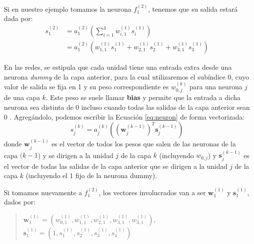 \documentclass[../../main.tex]{subfiles}
\begin{document}

Si en nuestro ejemplo tomamos la neurona \(f^{(2)}_1\), tenemos que su salida estará dada
por:
\begin{align*}
    s^{(2)}_1 &= a^{(2)}_1 \left( \sum_{i=1}^{3} w^{(1)}_{i,1} s^{(1)}_i \right) \\
              &= a^{(2)}_1 \left( w^{(1)}_{1,1}s^{(1)}_1 +  w^{(1)}_{2,1}s^{(1)}_2 + w^{(1)}_{3,1}s^{(1)}_3 \right)
\end{align*}

En las redes, se estipula que cada unidad tiene una entrada extra desde una neurona
\textit{dummy} de la capa anterior, para la cual utilizaremos el subíndice 0, cuyo valor
de salida se fija en 1 y su peso correspondiente es \(w^{(k)}_{0,j}\) para una neurona
\(j\) de una capa \(k\)\footnotemark. Este peso se suele llamar \textbf{bias} y permite
que la entrada a dicha neurona sea distinta de 0 incluso cuando todas las salidas de la
capa anterior sean 0 \cite{ai-a-modern-approach}. Agregándolo, podemos escribir la
Ecuación \ref{eq:neuron} de forma vectorizada:
\begin{equation}
    s^{(k)}_j = a^{(k)}_j \left( \left( \bm{w}^{(k-1)}_j \right)^T \bm{s}^{(k-1)}_j \right)
\end{equation}
donde \(\bm{w}^{(k-1)}_j\) es el vector de todos los pesos que salen de las neuronas de la
capa \((k-1\)) y se dirigen a la unidad \(j\) de la capa \(k\) (incluyendo \(w_{0,j}\)) y
\(\bm{s}^{(k-1)}_j\) es el vector de todas las salidas de la capa anterior que se
dirigen a la unidad \(j\) de la capa \(k\) (incluyendo el 1 fijo de la neurona dummy).

Si tomamos nuevamente a \(f^{(2)}_1\), los vectores involucrados van a ser \(\bm{w}^{(1)}_1\)
y \(\bm{s}^{(1)}_1\), dados por:
\begin{quote}
    \(\bm{w}^{(1)}_1 = (w^{(1)}_{0,1}, w^{(1)}_{1,1}, w^{(1)}_{2,1}, w^{(1)}_{3,1}, w^{(1)}_{3,1})\),
    \(\bm{s}^{(1)}_1 = (1, s^{(1)}_1, s^{(1)}_2, s^{(1)}_3, s^{(1)}_4)\)
\end{quote}
\end{document}
